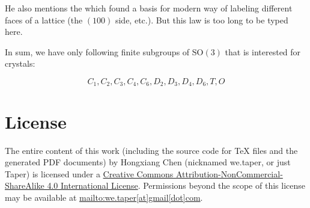 \documentclass{article}
\begin{document}
He also mentions the  which found a basis for
modern way of labeling different faces of a lattice (the $(100)$ side, etc.).
But this law is too long to be typed here.

In sum, we have only following finite subgroups of $\mathrm{SO}(3)$ that is
interested for crystals:

$$ C_1, C_2, C_3, C_4, C_6, D_2, D_3, D_4, D_6, T, O $$




\printnomenclature
\section{License}
The entire content of this work (including the source code
for TeX files and the generated PDF documents) by 
Hongxiang Chen (nicknamed we.taper, or just Taper) is
licensed under a 
\href{http://creativecommons.org/licenses/by-nc-sa/4.0/}{Creative 
Commons Attribution-NonCommercial-ShareAlike 4.0 International 
License}. Permissions beyond the scope of this 
license may be available at \url{mailto:we.taper[at]gmail[dot]com}.
\end{document}
